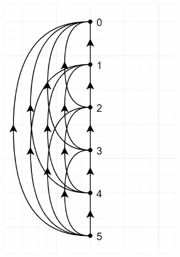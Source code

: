 \documentclass[a4 paper]{article}
\numberwithin{equation}{section}
\newcommand{\0}{\mathbf{0}}
\begin{document}
\begin{itemize}
\begin{figure}[h]
\begin{subfigure}[b]{0.3\textwidth}
            \includegraphics[width=\textwidth]{q1_hassediagram2.png}
            \caption{}
        \end{subfigure}
        \begin{subfigure}[b]{0.3\textwidth}

\end{subfigure}
\end{figure}
\end{itemize}
\end{document}
